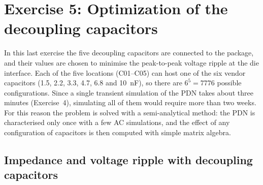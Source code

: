 \section{Exercise 5: Optimization of the decoupling capacitors}

In this last exercise the five decoupling capacitors are connected to the package, and their values are chosen to minimise the peak-to-peak voltage ripple at the
die interface. Each of the five locations (C01--C05) can host one of the six vendor capacitors (1.5, 2.2, 3.3, 4.7, 6.8 and 10~nF), so there are
$6^5 = 7776$ possible configurations. Since a single transient simulation of the PDN takes about three minutes (Exercise~4), simulating all of them would require
more than two weeks. For this reason the problem is solved with a semi-analytical method: the PDN is characterised only once with a few AC
simulations, and the effect of any configuration of capacitors is then computed with simple matrix algebra.


\subsection{Impedance and voltage ripple with decoupling capacitors}
\label{sec:theory}


